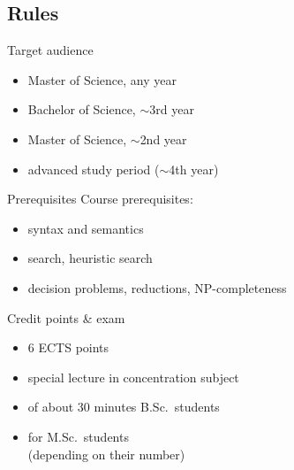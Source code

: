 \documentclass{gkibeamer}
\begin{document}
\subsection{Rules}

\begin{frame}{Target audience}
  \begin{itemize}
  \item Master of Science, any year
  \item Bachelor of Science, $\sim$3rd year
  \end{itemize}

  \bigskip

  \begin{itemize}
  \item Master of Science, $\sim$2nd year
  \end{itemize}

  \bigskip

  \begin{itemize}
  \item advanced study period ($\sim$4th year)
  \end{itemize}
\end{frame}

\begin{frame}{Prerequisites}
  Course prerequisites:
  \begin{itemize}
  \item {} syntax and semantics
  \item {} search, heuristic search
  \item {} decision problems,
    reductions, NP-completeness
  \end{itemize}
\end{frame}

\begin{frame}{Credit points \& exam}
  \begin{itemize}
  \item 6 ECTS points
  \item special lecture in concentration subject \\
  \item {} of about 30 minutes B.Sc.\ students
  \item {} for M.Sc.\ students\\
    (depending on their number)
  \end{itemize}
\end{frame}
\end{document}

